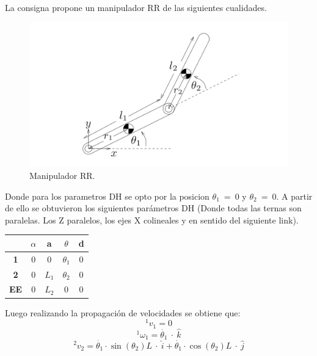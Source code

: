 %

%

La consigna propone un manipulador RR de las siguientes cualidades.
\begin{figure}[H]
	\centering
	\includegraphics[width=0.8\linewidth]{ImagenesDeducción de modelo/brazo}
	\caption{Manipulador RR.}	
	\label{fig:brazo}
\end{figure}
Donde para los parametros DH se opto por la posicion $\theta_1 \ = \ 0$ y $\theta_2 \ = \ 0$.
A partir de ello se obtuvieron los siguientes par\'ametros DH (Donde todas las ternas son paralelas. Los Z paralelos, los ejes X colineales y en sentido del siguiente link).
\begin{table}[H]
\centering
\begin{tabular}{c|c|c|c|c}
\textbf{}   & \textbf{$\alpha$} & \textbf{a} & \textbf{$\theta$} & \textbf{d} \\ \hline
\textbf{1}  & 0                 & 0          & $\theta_1$        & 0          \\
\textbf{2}  & 0                 & $L_1$      & $\theta_2$        & 0          \\
\textbf{EE} & 0                 & $L_2$      & 0                 & 0          \\ \hline
\end{tabular}
\end{table}
Luego realizando la propagaci\'on de velocidades se obtiene que:
\begin{equation}
^1v_1 = 0 
\end{equation}
\begin{equation}
^1\omega_1= \dot{\theta_1} \ \cdot \ \hat{k}
\end{equation}
\begin{equation}
^2v_2 = \dot{\theta_1} \cdot \sin(\theta_2)L \  \cdot \ \hat{i} + \dot{\theta_1} \cdot \cos(\theta_2)L  \ \cdot \  \hat{j}
\end{equation}

